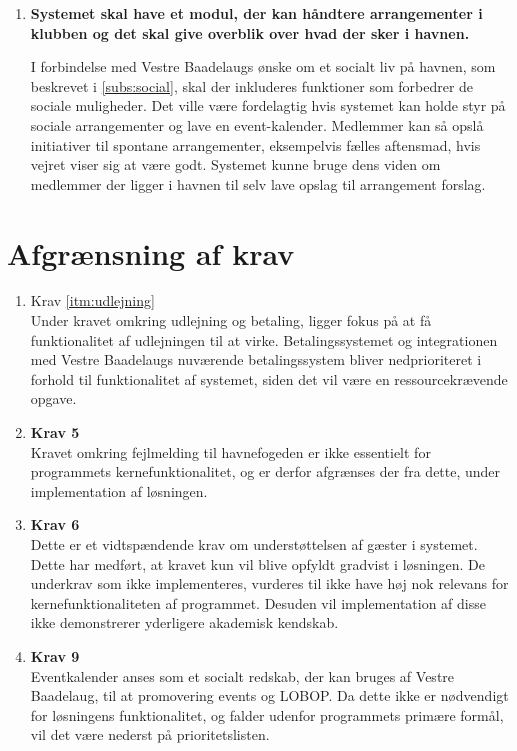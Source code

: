\begin{enumerate}
\item \label{itm:events} \textbf{Systemet skal have et modul, der kan håndtere arrangementer i klubben og det skal give overblik over hvad der sker i havnen.}

I forbindelse med Vestre Baadelaugs ønske om et socialt liv på havnen, som beskrevet i \cref{subs:social}, skal der inkluderes funktioner som forbedrer de sociale muligheder. Det ville være fordelagtig hvis systemet kan holde styr på sociale arrangementer og lave en event-kalender. Medlemmer kan så opslå initiativer til spontane arrangementer, eksempelvis fælles aftensmad, hvis vejret viser sig at være godt. Systemet kunne bruge dens viden om medlemmer der ligger i havnen til selv lave opslag til arrangement forslag.

\end{enumerate}

\section{Afgrænsning af krav}

\begin{enumerate}
  \item \label{itm:afg_udlejning} Krav \ref{itm:udlejning} \\
  Under kravet omkring udlejning og betaling, ligger fokus på at få funktionalitet af udlejningen til at virke. Betalingssystemet og integrationen med Vestre Baadelaugs nuværende betalingssystem bliver nedprioriteret i forhold til funktionalitet af systemet, siden det vil være en ressourcekrævende opgave.

  \item \label{itm:events} \textbf{Krav 5} \\
  Kravet omkring fejlmelding til havnefogeden er ikke essentielt for programmets kernefunktionalitet, og er derfor afgrænses der fra dette, under implementation af løsningen.

  \item \label{itm:events} \textbf{Krav 6} \\
  Dette er et vidtspændende krav om understøttelsen af gæster i systemet. Dette har medført, at kravet kun vil blive opfyldt gradvist i løsningen. De underkrav som ikke implementeres, vurderes til ikke have høj nok relevans for kernefunktionaliteten af programmet. Desuden vil implementation af disse ikke demonstrerer yderligere akademisk kendskab.

  \item \label{itm:events} \textbf{Krav 9} \\
  Eventkalender anses som et socialt redskab, der kan bruges af Vestre Baadelaug, til at promovering events og LOBOP. Da dette ikke er nødvendigt for løsningens funktionalitet, og falder udenfor programmets primære formål, vil det være nederst på prioritetslisten.
\end{enumerate}
